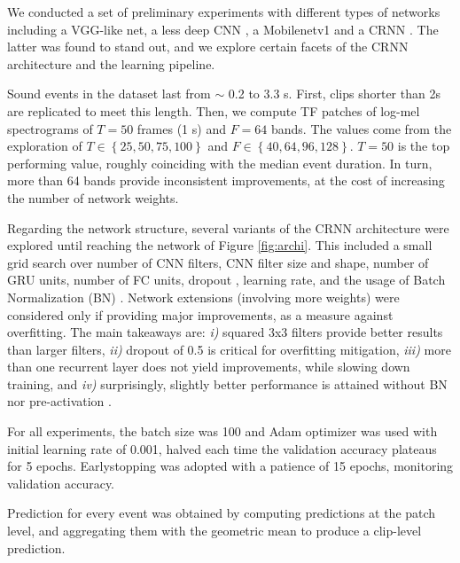 We conducted a set of preliminary experiments with different types of networks including a VGG-like net, a less deep CNN \cite{Fonseca2019learning}, a Mobilenetv1 \cite{howard2017mobilenets} and a CRNN \cite{cakir2017convolutional}.
The latter was found to stand out, and we explore certain facets of the CRNN architecture and the learning pipeline.

Sound events in the dataset last from $\sim$ 0.2 to 3.3 s.
First, clips shorter than 2s are replicated to meet this length.
Then, we compute TF patches of log-mel spectrograms of $T=50$ frames (1 s) and $F=64$ bands.
The values come from the exploration of $T \in \left\lbrace 25,50,75,100\right\rbrace$ and $F \in \left\lbrace 40,64,96,128\right\rbrace$.
$T=50$ is the top performing value, roughly coinciding with the median event duration. In turn, more than 64 bands provide inconsistent improvements, at the cost of increasing the number of network weights.

Regarding the network structure, several variants of the CRNN architecture were explored until reaching the network of Figure \ref{fig:archi}.
This included a small grid search over number of CNN filters, CNN filter size and shape, number of GRU units, number of FC units, dropout \cite{srivastava2014dropout}, learning rate, and the usage of Batch Normalization (BN) \cite{ioffe2015batch}.
Network extensions (involving more weights) were considered only if providing major improvements, as a measure against overfitting.
The main takeaways are: \textit{i)} squared 3x3 filters provide better results than larger filters, \textit{ii)} dropout of 0.5 is critical for overfitting mitigation, \textit{iii)} more than one recurrent layer does not yield improvements, while slowing down training, and \textit{iv)} surprisingly, slightly better performance is attained without BN nor pre-activation \cite{fonseca2018simple}.

For all experiments, the batch size was 100 and Adam optimizer was used \cite{kingma2014adam} with initial learning rate of 0.001, halved each time the validation accuracy plateaus for 5 epochs.
Earlystopping was adopted with a patience of 15 epochs, monitoring validation accuracy.

Prediction for every event was obtained by computing predictions at the patch level, and aggregating them with the geometric mean to produce a clip-level prediction.


